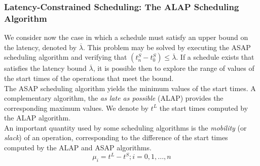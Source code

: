 \subsubsection{Latency-Constrained Scheduling: The ALAP Scheduling Algorithm}
We consider now the case in which a schedule must satisfy an upper bound on the latency, denoted by $  \overline{\lambda} $.  This problem may be solved by executing the ASAP scheduling algorithm and verifying that $ (t^{S}_{n} - t^{S}_{0}) \leq \overline{\lambda}$. If a schedule exists that satisfies the latency bound $  \overline{\lambda} $,  it is possible then to explore the range of values of the start times of the operations that meet the bound.\\
The ASAP scheduling algorithm yields the minimum values of the start times.  A  complementary algorithm, the  \textit{as late as possible } (ALAP)   provides the corresponding maximum values. We denote by  $ t^{L} $  the start times computed by the ALAP algorithm.\\
An important quantity used by some scheduling algorithms is the  \textit{mobility}  (or \textit{slack})  of an operation, corresponding to the difference of the start times computed by the ALAP and ASAP algorithms.
\[\mu_{i}=t^{L}-t^{S}; i=0,1,...,n  \]

